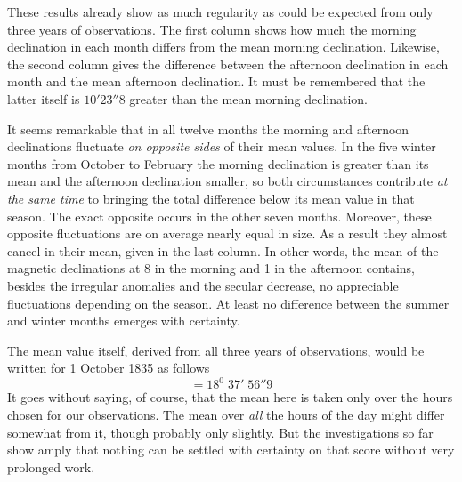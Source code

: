 These results already show as much regularity as could be expected from only three years of observations. The first column shows how much the morning declination in each month differs from the mean morning declination. Likewise, the second column gives the difference between the afternoon declination in each month and the mean afternoon declination. It must be remembered that the latter itself is $10'23''8$ greater than the mean morning declination.

It seems remarkable that in all twelve months the morning and afternoon declinations fluctuate \textit{on opposite sides} of their mean values. In the five winter months from October to February the morning declination is greater than its mean and the afternoon declination smaller, so both circumstances contribute \textit{at the same time} to bringing the total difference below its mean value in that season. The exact opposite occurs in the other seven months. Moreover, these opposite fluctuations are on average nearly equal in size. As a result they almost cancel in their mean, given in the last column. In other words, the mean of the magnetic declinations at 8 in the morning and 1 in the afternoon
contains, besides the irregular anomalies and the secular decrease, no appreciable fluctuations depending on the season. At least no difference between the summer and winter months emerges with certainty.

The mean value itself, derived from all three years of observations, would be written for 1 October 1835 as follows
\[
=18^0\;37'\;56''9
\]
It goes without saying, of course, that the mean here is taken only over the hours chosen for our observations. The mean over \textit{all} the hours of the day might differ somewhat from it, though probably only slightly. But the investigations so far show amply that nothing can be settled with certainty on that score without very prolonged work.

